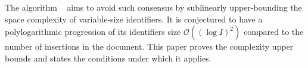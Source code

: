 \noindent The algorithm \LSEQ~\cite{nedelec2013lseq} aims to avoid such
consensus by sublinearly upper-bounding the space complexity of variable-size
identifiers. It is conjectured to have a polylogarithmic progression of its
identifiers size $\mathcal{O}((\log I)^2)$ compared to the number of insertions
in the document. This paper proves the complexity upper bounds and states the
conditions under which it applies.



